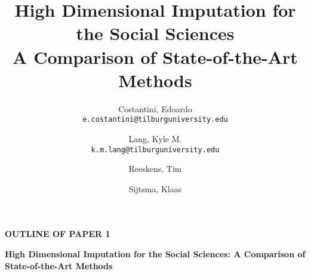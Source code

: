 \documentclass[10pt]{article}
\title{High Dimensional Imputation for the Social Sciences\\ \Large A Comparison of State-of-the-Art Methods}
\author{
  Costantini, Edoardo\\
  \small\texttt{e.costantini@tilburguniversity.edu}
  \and
  Lang, Kyle M.\\
  \small\texttt{k.m.lang@tilburguniversity.edu}
  \and  
  Reeskens, Tim \\
  \and  
  Sijtsma, Klaas\\
}
\newcommand{\pathBIB}{../../../statsLib}
\begin{document}

\begin{center}
\textbf{OUTLINE OF PAPER 1}

\textbf{High Dimensional Imputation for the Social Sciences: A Comparison of State-of-the-Art Methods}

\end{center}



\pagebreak

\maketitle

\begin{multicols}{2}

























\end{multicols} %


\end{document}
